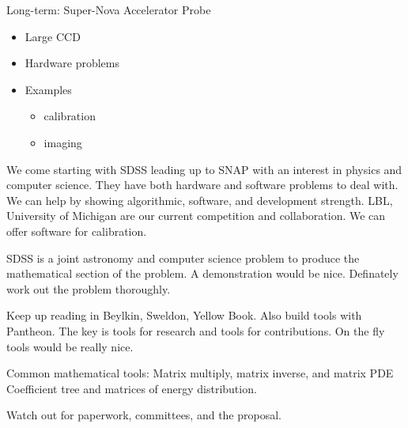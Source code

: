 \documentclass[11pt]{article}
\begin{document}
Long-term: Super-Nova Accelerator Probe
\begin{itemize}
\item Large CCD
\item Hardware problems
\item Examples
\begin{itemize}
\item calibration
\item imaging 
\end{itemize}

\end{itemize}

We come starting with SDSS leading up to SNAP with an interest in physics and computer science.  They have both hardware and software problems to deal with.  We can help by showing algorithmic, software, and development strength.   LBL, University of Michigan are our current competition and collaboration.  We can offer software for calibration.  

SDSS is a joint astronomy and computer science problem to produce the mathematical section of the problem.  A demonstration would be nice.  Definately work out the problem thoroughly.  

Keep up reading in Beylkin, Sweldon, Yellow Book.   Also build tools with Pantheon.  The key is tools for research and tools for contributions.  On the fly tools would be really nice.


Common mathematical tools: Matrix multiply, matrix inverse, and matrix PDE  Coefficient tree and matrices of energy distribution.  

Watch out for paperwork, committees, and the proposal.

 
\end{document}
